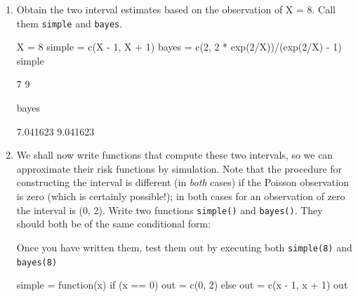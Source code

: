 \documentclass[12pt, a4paper]{article}\usepackage[]{graphicx}\usepackage[]{color}
\begin{document}


\pagestyle{default}
\thispagestyle{empty}

\newpage
\setcounter{page}{1}
\begin{enumerate}[label={\bfseries\arabic*.}]
\item Obtain the two interval estimates based on the observation of X = 8. Call them \verb+simple+ and \verb+bayes+.

\setlength{\leftskip}{3ex}


\begin{Schunk}
\begin{Sinput}
X = 8
simple = c(X - 1, X + 1)
bayes = c(2, 2 * exp(2/X))/(exp(2/X) - 1)
simple
\end{Sinput}
\begin{Soutput}
[1] 7 9
\end{Soutput}
\begin{Sinput}
bayes
\end{Sinput}
\begin{Soutput}
[1] 7.041623 9.041623
\end{Soutput}
\end{Schunk}

\setlength{\leftskip}{0ex}

\item We shall now write functions that compute these two intervals, so we can approximate their risk functions by simulation. Note that the procedure for constructing the interval is different (in \textit{both} cases) if the Poisson observation is zero (which is certainly possible!); in both cases for an observation of zero the interval is (0, 2). Write two functions \verb+simple()+ and \verb+bayes()+. They should both be of the same conditional form:

Once you have written them, test them out by executing both \verb+simple(8)+ and \verb+bayes(8)+

\setlength{\leftskip}{3ex}


\begin{Schunk}
\begin{Sinput}
simple = function(x) {
    if (x == 0) {
        out = c(0, 2)
    } else {
        out = c(x - 1, x + 1)
    }
    out
}


\end{Sinput}
\end{Schunk}
\end{enumerate}
\end{document}
